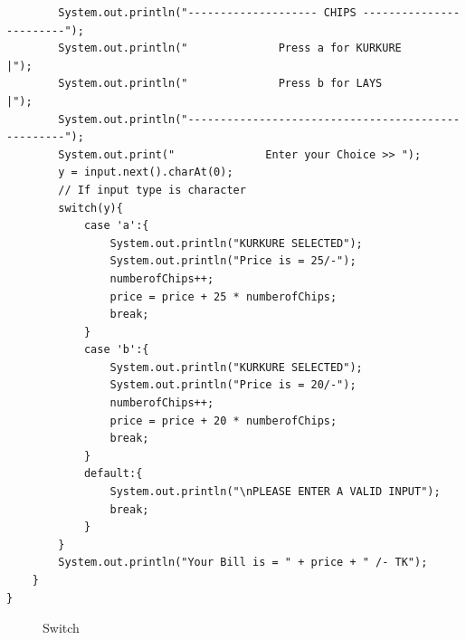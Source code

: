 \documentclass[openany]{book}  %
\begin{document}
\begin{flushleft}
\begin{center}
{\begin{verbatim}
        System.out.println("-------------------- CHIPS ------------------------");
        System.out.println("              Press a for KURKURE                  |");
        System.out.println("              Press b for LAYS                     |");
        System.out.println("---------------------------------------------------");
        System.out.print("              Enter your Choice >> ");
        y = input.next().charAt(0);
        // If input type is character
        switch(y){
            case 'a':{
                System.out.println("KURKURE SELECTED");
                System.out.println("Price is = 25/-");
                numberofChips++;
                price = price + 25 * numberofChips;
                break;
            }
            case 'b':{
                System.out.println("KURKURE SELECTED");
                System.out.println("Price is = 20/-");
                numberofChips++;
                price = price + 20 * numberofChips;
                break;
            }
            default:{
                System.out.println("\nPLEASE ENTER A VALID INPUT");
                break;
            }
        }
        System.out.println("Your Bill is = " + price + " /- TK");
    }
}
\end{verbatim}
        }
    \end{center}

    \begin{figure}[htbp]
        \begin{center}
            \caption{Switch\cite{Ref3}}
        \end{center}
    \end{figure}

    \newpage


\end{flushleft}
\end{document}
